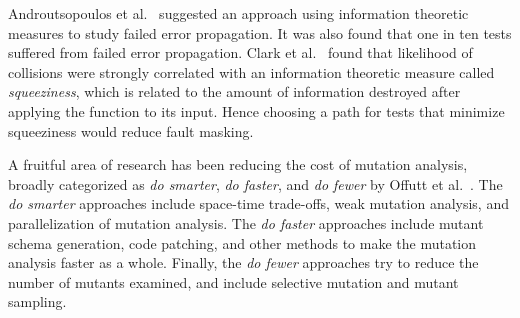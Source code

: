 \documentclass[preprint,nonatbib]{sigplanconf}\usepackage[]{graphicx}\usepackage[]{color}
\begin{document}
Androutsopoulos et al.~\cite{androutsopoulos2014an} suggested an
approach using information theoretic measures to study failed error
propagation. It was also found that one in ten tests suffered from failed
error propagation. Clark et al.~\cite{clark2012squeeziness} found that
likelihood of collisions were strongly correlated with an information theoretic
measure called \emph{squeeziness}, which is related to the amount of information
destroyed after applying the function to its input. Hence choosing a path for
tests that minimize squeeziness would reduce fault masking.

A fruitful area of research has been reducing the cost of mutation
analysis, broadly categorized as \textit{do smarter}, \textit{do
faster}, and \textit{do fewer} by Offutt et al.~\cite{offutt2001mutation}.
The \textit{do smarter} approaches include space-time trade-offs, weak
mutation analysis, and parallelization of mutation analysis. The \textit{do
faster} approaches include mutant schema generation, code patching, and
other methods to make the mutation analysis faster as a whole. Finally, the
\textit{do fewer} approaches try to reduce the number of mutants examined,
and include selective mutation and mutant sampling.

\begin{comment}
Various studies have tried to tackle the problem of approximating the full
mutation score without running a full mutation analysis.  The idea of
using only a subset of mutants (\textit{do fewer}) was conceived first
by Budd~\cite{budd1980mutation} and Acree~\cite{acree1980mutation}
who showed that using just 10\% of the mutants was sufficient to
achieve 99\% accuracy of prediction for the final mutation score. This
idea was further investigated by Mathur~\cite{mathur1991performance},
Wong et al.~\cite{wong1993mutation,wong1995reducing}, and Offutt et
al.~\cite{offutt1993experimental} using the Mothra~\cite{demillo1988an} mutation
operators for FORTRAN.  Lu Zhang et al.~\cite{zhang2010isoperator} compared
operator-based mutant selection techniques to random mutant sampling,
and found that random sampling performs as well as the operator selection
methods.  Lingming Zhang et al.~\cite{zhang2013operator} compared various
forms of sampling such as stratified random sampling based on operator strata,
stratified random sampling based on program element strata, and a combination
of the two. They found that stratified random sampling when strata were
used in conjunction performed best in predicting the final mutation score,
and as few as 5\% mutants was sufficient sample for a 99\% correlation with the actual
mutation score. Recently, it was found~\cite{gopinath2015howhard} that $9,604$
mutants were sufficient for obtaining $1\%$ accuracy for $99\%$ of the projects,
irrespective of the independence of mutants, or their total population.
\end{comment}
\end{document}
